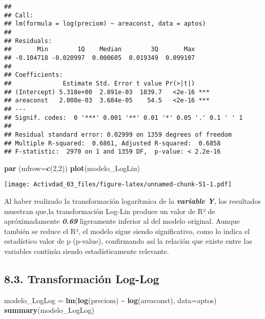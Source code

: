 \documentclass[
]{article}
\newenvironment{Shaded}{\begin{snugshade}}{\end{snugshade}}
\newcommand{\AttributeTok}[1]{\textcolor[rgb]{0.13,0.29,0.53}{#1}}
\newcommand{\DecValTok}[1]{\textcolor[rgb]{0.00,0.00,0.81}{#1}}
\newcommand{\FunctionTok}[1]{\textcolor[rgb]{0.13,0.29,0.53}{\textbf{#1}}}
\newcommand{\NormalTok}[1]{#1}
\newcommand{\OtherTok}[1]{\textcolor[rgb]{0.56,0.35,0.01}{#1}}
\newcommand{\SpecialCharTok}[1]{\textcolor[rgb]{0.81,0.36,0.00}{\textbf{#1}}}
\begin{document}
\begin{verbatim}
## 
## Call:
## lm(formula = log(preciom) ~ areaconst, data = aptos)
## 
## Residuals:
##       Min        1Q    Median        3Q       Max 
## -0.104718 -0.020997  0.000605  0.019349  0.099107 
## 
## Coefficients:
##              Estimate Std. Error t value Pr(>|t|)    
## (Intercept) 5.318e+00  2.891e-03  1839.7   <2e-16 ***
## areaconst   2.008e-03  3.684e-05    54.5   <2e-16 ***
## ---
## Signif. codes:  0 '***' 0.001 '**' 0.01 '*' 0.05 '.' 0.1 ' ' 1
## 
## Residual standard error: 0.02999 on 1359 degrees of freedom
## Multiple R-squared:  0.6861, Adjusted R-squared:  0.6858 
## F-statistic:  2970 on 1 and 1359 DF,  p-value: < 2.2e-16
\end{verbatim}

\begin{Shaded}
\begin{Highlighting}[]
\FunctionTok{par}\NormalTok{ (}\AttributeTok{mfrow=}\FunctionTok{c}\NormalTok{(}\DecValTok{2}\NormalTok{,}\DecValTok{2}\NormalTok{))}
\FunctionTok{plot}\NormalTok{(modelo\_LogLin)}
\end{Highlighting}
\end{Shaded}

\texttt{[image: Activdad\_03\_files/figure-latex/unnamed-chunk-51-1.pdf]}

Al haber realizado la transformación logarítmica de la
\textbf{\emph{variable Y}}, los resultados muestran que,la
transformación Log-Lin produce un valor de R² de apróximadamente
\textbf{\emph{0.69}} ligeramente inferior al del modelo original. Aunque
también se reduce el R², el modelo sigue siendo significativo, como lo
indica el estadístico valor de p (p-value), confirmando así la relación
que existe entre las variables continúa siendo estadísticamente
relevante.

\subsection{\texorpdfstring{\textbf{8.3. Transformación
Log-Log}}{8.3. Transformación Log-Log}}\label{transformaciuxf3n-log-log}

\begin{Shaded}
\begin{Highlighting}[]
\NormalTok{modelo\_LogLog }\OtherTok{=} \FunctionTok{lm}\NormalTok{(}\FunctionTok{log}\NormalTok{(preciom) }\SpecialCharTok{\textasciitilde{}} \FunctionTok{log}\NormalTok{(areaconst), }\AttributeTok{data=}\NormalTok{aptos) }
\FunctionTok{summary}\NormalTok{(modelo\_LogLog)}
\end{Highlighting}
\end{Shaded}
\end{document}
